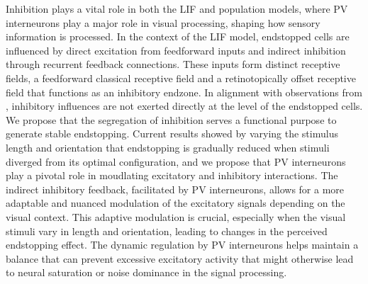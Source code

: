 \documentclass[12pt]{article}
\begin{document}

Inhibition plays a vital role in both the LIF and population models, where PV interneurons play a major role in visual processing, shaping how sensory information is processed. In the context of the LIF model, endstopped cells are influenced by direct excitation from feedforward inputs and indirect inhibition through recurrent feedback connections. These inputs form distinct receptive fields, a feedforward classical receptive field and a retinotopically offset receptive field that functions as an inhibitory endzone. In alignment with observations from \textcite{sillitoContributionExcitatoryInhibitory1977}, inhibitory influences are not exerted directly at the level of the endstopped cells. We propose that the segregation of inhibition serves a functional purpose to generate stable endstopping. Current results showed by varying the stimulus length and orientation that endstopping is gradually reduced when stimuli diverged from its optimal configuration, and we propose that PV interneurons play a pivotal role in moudlating excitatory and inhibitory interactions. The indirect inhibitory feedback, facilitated by PV interneurons, allows for a more adaptable and nuanced modulation of the excitatory signals depending on the visual context. This adaptive modulation is crucial, especially when the visual stimuli vary in length and orientation, leading to changes in the perceived endstopping effect. The dynamic regulation by PV interneurons helps maintain a balance that can prevent excessive excitatory activity that might otherwise lead to neural saturation or noise dominance in the signal processing.
\end{document}
